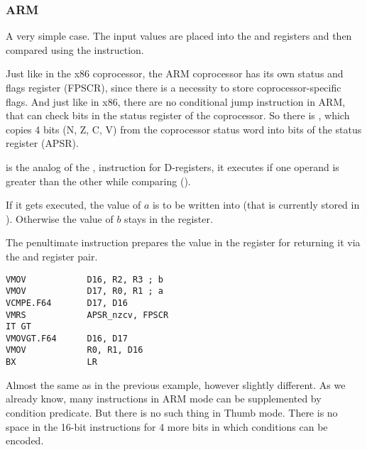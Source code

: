 \subsubsection{ARM}

\myparagraph{\OptimizingXcodeIV (\ARMMode)}



A very simple case.
The input values are placed into the  and  registers and then compared using the  instruction.

Just like in the x86 coprocessor, the ARM coprocessor has its own status and flags register (\ac{FPSCR}),
since there is a necessity to store coprocessor-specific flags.
And just like in x86, there are no conditional jump instruction in ARM, 
that can check bits in the status register of the coprocessor. 
So there is , which copies 4 bits (N, Z, C, V) from the coprocessor status word into bits of the  status register (\ac{APSR}).

 is the analog of the , 
instruction for D-registers, it executes if one operand is greater than the other while comparing (). 

If it gets executed, the value of $a$ is to be written into  (that is currently stored in ).
Otherwise the value of $b$ stays in the  register.


The penultimate instruction  prepares the value in the  register for returning it via the  and 
register pair.

\myparagraph{\OptimizingXcodeIV (\ThumbTwoMode)}

\begin{lstlisting}[caption=\OptimizingXcodeIV (\ThumbTwoMode),style=customasmARM]
VMOV            D16, R2, R3 ; b
VMOV            D17, R0, R1 ; a
VCMPE.F64       D17, D16
VMRS            APSR_nzcv, FPSCR
IT GT 
VMOVGT.F64      D16, D17
VMOV            R0, R1, D16
BX              LR
\end{lstlisting}

Almost the same as in the previous example, however slightly different.
As we already know, many instructions in ARM mode can be supplemented by condition predicate.
But there is no such thing in Thumb mode. 
There is no space in the 16-bit instructions for 4 more bits in which conditions can be encoded.

